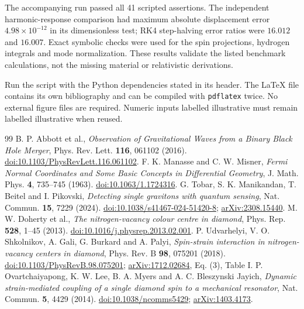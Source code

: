 \documentclass[a4paper,11pt]{article}
\newcommand{\code}[1]{\texttt{#1}}
\begin{document}
The accompanying run passed all 41 scripted assertions. The independent harmonic-response comparison had maximum absolute displacement error $4.98\times10^{-12}$ in its dimensionless test; RK4 step-halving error ratios were $16.012$ and $16.007$. Exact symbolic checks were used for the spin projections, hydrogen integrals and mode normalization. These results validate the listed benchmark calculations, not the missing material or relativistic derivations.

Run the script with the Python dependencies stated in its header. The LaTeX file contains its own bibliography and can be compiled with \code{pdflatex} twice. No external figure files are required. Numeric inputs labelled illustrative must remain labelled illustrative when reused.

\begin{thebibliography}{99}\small
{} B. P. Abbott et al., \emph{Observation of Gravitational Waves from a Binary Black Hole Merger}, Phys. Rev. Lett. \textbf{116}, 061102 (2016). \href{https://doi.org/10.1103/PhysRevLett.116.061102}{doi:10.1103/PhysRevLett.116.061102}.
 F. K. Manasse and C. W. Misner, \emph{Fermi Normal Coordinates and Some Basic Concepts in Differential Geometry}, J. Math. Phys. \textbf{4}, 735--745 (1963). \href{https://doi.org/10.1063/1.1724316}{doi:10.1063/1.1724316}.
 G. Tobar, S. K. Manikandan, T. Beitel and I. Pikovski, \emph{Detecting single gravitons with quantum sensing}, Nat. Commun. \textbf{15}, 7229 (2024). \href{https://doi.org/10.1038/s41467-024-51420-8}{doi:10.1038/s41467-024-51420-8}; \href{https://arxiv.org/abs/2308.15440}{arXiv:2308.15440}.
 M. W. Doherty et al., \emph{The nitrogen-vacancy colour centre in diamond}, Phys. Rep. \textbf{528}, 1--45 (2013). \href{https://doi.org/10.1016/j.physrep.2013.02.001}{doi:10.1016/j.physrep.2013.02.001}.
 P. Udvarhelyi, V. O. Shkolnikov, A. Gali, G. Burkard and A. Palyi, \emph{Spin-strain interaction in nitrogen-vacancy centers in diamond}, Phys. Rev. B \textbf{98}, 075201 (2018). \href{https://doi.org/10.1103/PhysRevB.98.075201}{doi:10.1103/PhysRevB.98.075201}; \href{https://arxiv.org/abs/1712.02684}{arXiv:1712.02684}, Eq. (3), Table I.
 P. Ovartchaiyapong, K. W. Lee, B. A. Myers and A. C. Bleszynski Jayich, \emph{Dynamic strain-mediated coupling of a single diamond spin to a mechanical resonator}, Nat. Commun. \textbf{5}, 4429 (2014). \href{https://doi.org/10.1038/ncomms5429}{doi:10.1038/ncomms5429}; \href{https://arxiv.org/abs/1403.4173}{arXiv:1403.4173}.

\end{thebibliography}
\end{document}
